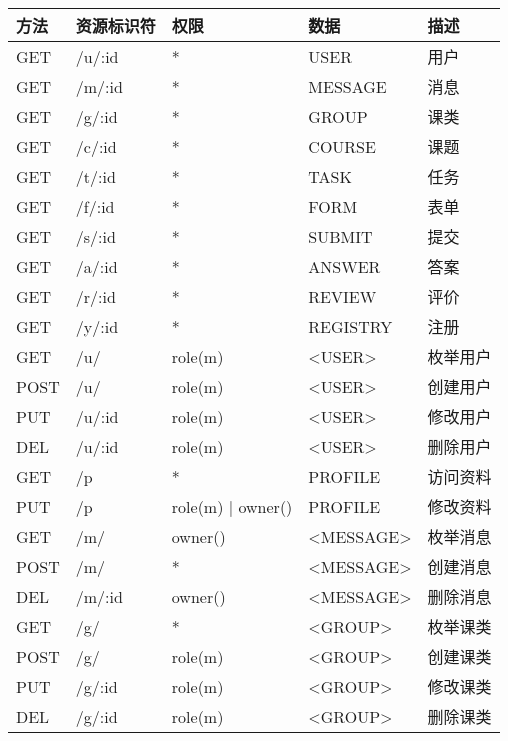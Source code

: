 
\noindent
\ttfamily
\begin{longtable}{|p{1.2cm}|p{3cm}|p{3cm}|p{4cm}|X|}
  \hline
  \textbf{方法} & \textbf{资源标识符} & \textbf{权限} & \textbf{数据} & \textbf{描述} \\ \hline

  GET  & /u/:id            & *    & USER         & 用户 \\ \hline
  GET  & /m/:id            & *    & MESSAGE      & 消息 \\ \hline
  GET  & /g/:id            & *    & GROUP        & 课类 \\ \hline
  GET  & /c/:id            & *    & COURSE       & 课题 \\ \hline
  GET  & /t/:id            & *    & TASK         & 任务 \\ \hline
  GET  & /f/:id            & *    & FORM         & 表单 \\ \hline
  GET  & /s/:id            & *    & SUBMIT       & 提交 \\ \hline
  GET  & /a/:id            & *    & ANSWER       & 答案 \\ \hline
  GET  & /r/:id            & *    & REVIEW       & 评价 \\ \hline
  GET  & /y/:id            & *    & REGISTRY     & 注册 \\ \hline

  GET  & /u/    & role(m) & <USER> & 枚举用户 \\ \hline
  POST & /u/    & role(m) & <USER> & 创建用户 \\ \hline
  PUT  & /u/:id & role(m) & <USER> & 修改用户 \\ \hline
  DEL  & /u/:id & role(m) & <USER> & 删除用户 \\ \hline

  GET  & /p     & *                 & PROFILE & 访问资料 \\ \hline
  PUT  & /p     & role(m) | owner() & PROFILE & 修改资料 \\ \hline

  GET  & /m/    & owner() & <MESSAGE> & 枚举消息 \\ \hline
  POST & /m/    & *       & <MESSAGE> & 创建消息 \\ \hline
  DEL  & /m/:id & owner() & <MESSAGE> & 删除消息 \\ \hline

  GET  & /g/    & *       & <GROUP> & 枚举课类 \\ \hline
  POST & /g/    & role(m) & <GROUP> & 创建课类 \\ \hline
  PUT  & /g/:id & role(m) & <GROUP> & 修改课类 \\ \hline
  DEL  & /g/:id & role(m) & <GROUP> & 删除课类 \\ \hline


\end{longtable}
